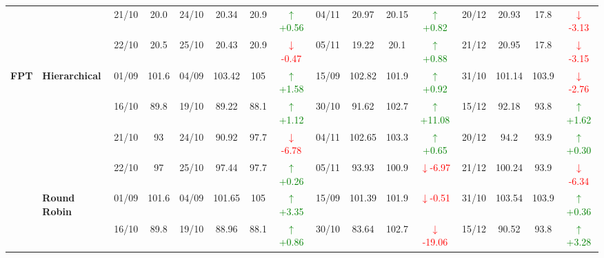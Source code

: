 \documentclass{ieeeaccess}
\begin{document}
{\begin{longtable}{llcc|cccc|cccc|cccc}
&
& 21/10 & 20.0 & 24/10 & 20.34 & 20.9 & \textcolor{green}{\(\uparrow\)+0.56} & 04/11 & 20.97 & 20.15 & \textcolor{green}{\(\uparrow\)+0.82} & 20/12 & 20.93 & 17.8 & \textcolor{red}{\(\downarrow\)-3.13} \\

&
& 22/10 & 20.5 & 25/10 & 20.43 & 20.9 & \textcolor{red}{\(\downarrow\)-0.47} & 05/11 & 19.22 & 20.1 & \textcolor{green}{\(\uparrow\)+0.88} & 21/12 & 20.95 & 17.8 & \textcolor{red}{\(\downarrow\)-3.15} \\
\midrule



\multirow{12}{*}{\textbf{FPT}} 
& \textbf{Hierarchical}
& 01/09 & 101.6 & 04/09 & 103.42 & 105 & \textcolor{green}{\(\uparrow\)+1.58} & 15/09 & 102.82 & 101.9 & \textcolor{green}{\(\uparrow\)+0.92} & 31/10 & 101.14 & 103.9 & \textcolor{red}{\(\downarrow\)-2.76} \\

&
& 16/10 & 89.8 & 19/10 & 89.22 & 88.1 & \textcolor{green}{\(\uparrow\)+1.12} & 30/10 & 91.62 & 102.7 & \textcolor{green}{\(\uparrow\)+11.08} & 15/12 & 92.18 & 93.8 & \textcolor{green}{\(\uparrow\)+1.62} \\

&
& 21/10 & 93 & 24/10 & 90.92 & 97.7 & \textcolor{red}{\(\downarrow\)-6.78} & 04/11 & 102.65 & 103.3 & \textcolor{green}{\(\uparrow\)+0.65} & 20/12 & 94.2 & 93.9 & \textcolor{green}{\(\uparrow\)+0.30} \\

&
& 22/10 & 97 & 25/10 & 97.44 & 97.7 & \textcolor{green}{\(\uparrow\)+0.26} & 05/11 & 93.93 & 100.9 & \textcolor{red}{\(\downarrow\)-6.97} & 21/12 & 100.24 & 93.9 & \textcolor{red}{\(\downarrow\)-6.34} \\
\cmidrule(lr){2-16}


& \textbf{Round Robin}
& 01/09 & 101.6 & 04/09 & 101.65 & 105 & \textcolor{green}{\(\uparrow\)+3.35} & 15/09 & 101.39 & 101.9 & \textcolor{red}{\(\downarrow\)-0.51} & 31/10 & 103.54 & 103.9 & \textcolor{green}{\(\uparrow\)+0.36} \\

&
& 16/10 & 89.8 & 19/10 & 88.96 & 88.1 & \textcolor{green}{\(\uparrow\)+0.86} & 30/10 & 83.64 & 102.7 & \textcolor{red}{\(\downarrow\)-19.06} & 15/12 & 90.52 & 93.8 & \textcolor{green}{\(\uparrow\)+3.28} \\


\end{longtable}}
\end{document}
